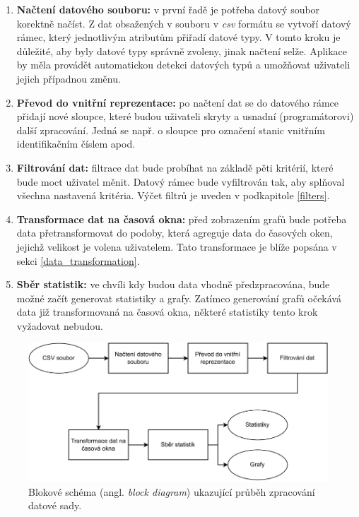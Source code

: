 \begin{enumerate}
    \item \textbf{Načtení datového souboru:} v první řadě je potřeba datový soubor korektně načíst. Z dat obsažených v souboru v \emph{csv} formátu se vytvoří datový rámec, který jednotlivým atributům přiřadí datové typy. V tomto kroku je důležité, aby byly datové typy správně zvoleny, jinak načtení selže. Aplikace by měla provádět automatickou detekci datových typů a umožňovat uživateli jejich případnou změnu.
    \item \textbf{Převod do vnitřní reprezentace:} po načtení dat se do datového rámce přidají nové sloupce, které budou uživateli skryty a usnadní (programátorovi) další zpracování. Jedná se např. o sloupce pro označení stanic vnitřním identifikačním číslem apod.
    \item \textbf{Filtrování dat:} filtrace dat bude probíhat na základě pěti kritérií, které bude moct uživatel měnit. Datový rámec bude vyfiltrován tak, aby splňoval všechna nastavená kritéria. Výčet filtrů je uveden v podkapitole \ref{filters}.
    \item \textbf{Transformace dat na časová okna:} před zobrazením grafů bude potřeba data přetransformovat do podoby, která agreguje data do časových oken, jejichž velikost je volena uživatelem. Tato transformace je blíže popsána v sekci \ref{data_transformation}.
    \item \textbf{Sběr statistik:} ve chvíli kdy budou data vhodně předzpracována, bude možné začít generovat statistiky a grafy. Zatímco generování grafů očekává data již transformovaná na časová okna, některé statistiky tento krok vyžadovat nebudou. 
\end{enumerate}

\begin{figure}[H]
	\centering
	\includegraphics[width=1\textwidth]{obrazky-figures/block_diagram.pdf}
	\caption{Blokové schéma (angl. \emph{block diagram}) ukazující průběh zpracování datové sady.}
	\label{fig:block_diagram}
\end{figure}


